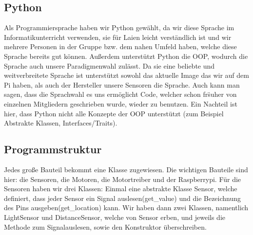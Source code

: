 \documentclass{report}
\begin{document}
\subsection{Python}
Als Programmiersprache haben wir Python gew\"{a}hlt, da wir diese Sprache im Informatikunterricht verwenden, sie f\"{u}r Laien leicht verst\"{a}ndlich ist und wir mehrere Personen in der Gruppe bzw. dem nahen Umfeld haben, welche diese Sprache bereits gut k\"{o}nnen. Au{\ss}erdem unterst\"{u}tzt Python die OOP, wodurch die Sprache auch unsere Paradigmenwahl zul\"{a}sst. Da sie eine beliebte und weitverbreitete Sprache ist unterst\"{u}tzt sowohl das aktuelle Image das wir auf dem Pi haben, als auch der Hersteller unsere Sensoren die Sprache. Auch kann man sagen, dass die Sprachwahl es uns erm\"{o}glicht Code, welcher schon fr\"s{u}her von einzelnen Mitgliedern geschrieben wurde, wieder zu benutzen.  Ein Nachteil ist hier, dass Python nicht alle Konzepte der OOP unterst\"{u}tzt (zum Beispiel Abstrakte Klassen, Interfaces/Traits).

\subsection{Programmstruktur}
Jedes gro{\ss}e Bauteil bekommt eine Klasse zugewiesen. Die wichtigen Bauteile sind hier: die Sensoren, die Motoren, die Motortreiber und der Raspberrypi. F\"{u}r die Sensoren haben wir drei Klassen: Einmal eine abstrakte Klasse Sensor, welche definiert, dass jeder Sensor ein Signal auslesen(get\_value) und die Bezeichnung des Pins ausgeben(get\_location) kann. Wir haben dann zwei Klassen, namentlich LightSensor und DistanceSensor, welche von Sensor erben, und jeweils die Methode zum Signalauslesen, sowie den Konstruktor \"{u}berschreiben.
\end{document}
